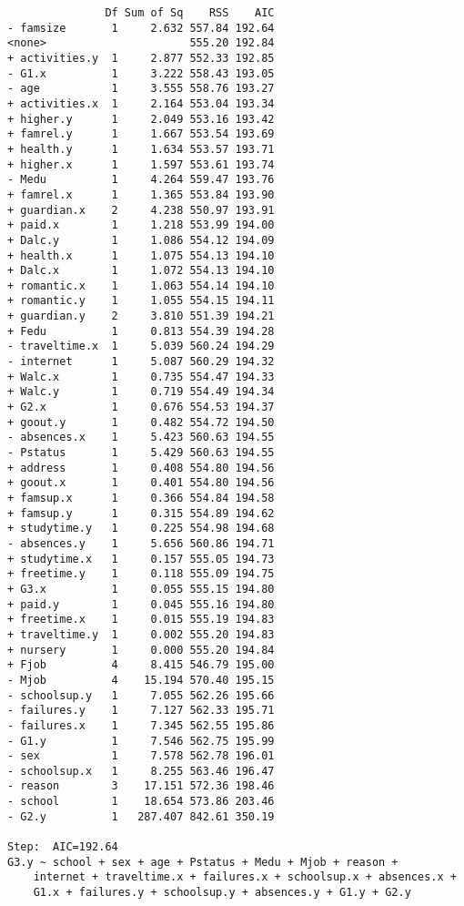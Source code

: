 \documentclass[11pt]{article}
\begin{document}
\begin{enumerate}
\begin{verbatim}
               Df Sum of Sq    RSS    AIC
- famsize       1     2.632 557.84 192.64
<none>                      555.20 192.84
+ activities.y  1     2.877 552.33 192.85
- G1.x          1     3.222 558.43 193.05
- age           1     3.555 558.76 193.27
+ activities.x  1     2.164 553.04 193.34
+ higher.y      1     2.049 553.16 193.42
+ famrel.y      1     1.667 553.54 193.69
+ health.y      1     1.634 553.57 193.71
+ higher.x      1     1.597 553.61 193.74
- Medu          1     4.264 559.47 193.76
+ famrel.x      1     1.365 553.84 193.90
+ guardian.x    2     4.238 550.97 193.91
+ paid.x        1     1.218 553.99 194.00
+ Dalc.y        1     1.086 554.12 194.09
+ health.x      1     1.075 554.13 194.10
+ Dalc.x        1     1.072 554.13 194.10
+ romantic.x    1     1.063 554.14 194.10
+ romantic.y    1     1.055 554.15 194.11
+ guardian.y    2     3.810 551.39 194.21
+ Fedu          1     0.813 554.39 194.28
- traveltime.x  1     5.039 560.24 194.29
- internet      1     5.087 560.29 194.32
+ Walc.x        1     0.735 554.47 194.33
+ Walc.y        1     0.719 554.49 194.34
+ G2.x          1     0.676 554.53 194.37
+ goout.y       1     0.482 554.72 194.50
- absences.x    1     5.423 560.63 194.55
- Pstatus       1     5.429 560.63 194.55
+ address       1     0.408 554.80 194.56
+ goout.x       1     0.401 554.80 194.56
+ famsup.x      1     0.366 554.84 194.58
+ famsup.y      1     0.315 554.89 194.62
+ studytime.y   1     0.225 554.98 194.68
- absences.y    1     5.656 560.86 194.71
+ studytime.x   1     0.157 555.05 194.73
+ freetime.y    1     0.118 555.09 194.75
+ G3.x          1     0.055 555.15 194.80
+ paid.y        1     0.045 555.16 194.80
+ freetime.x    1     0.015 555.19 194.83
+ traveltime.y  1     0.002 555.20 194.83
+ nursery       1     0.000 555.20 194.84
+ Fjob          4     8.415 546.79 195.00
- Mjob          4    15.194 570.40 195.15
- schoolsup.y   1     7.055 562.26 195.66
- failures.y    1     7.127 562.33 195.71
- failures.x    1     7.345 562.55 195.86
- G1.y          1     7.546 562.75 195.99
- sex           1     7.578 562.78 196.01
- schoolsup.x   1     8.255 563.46 196.47
- reason        3    17.151 572.36 198.46
- school        1    18.654 573.86 203.46
- G2.y          1   287.407 842.61 350.19

Step:  AIC=192.64
G3.y ~ school + sex + age + Pstatus + Medu + Mjob + reason + 
    internet + traveltime.x + failures.x + schoolsup.x + absences.x + 
    G1.x + failures.y + schoolsup.y + absences.y + G1.y + G2.y


\end{verbatim}
\end{enumerate}
\end{document}
